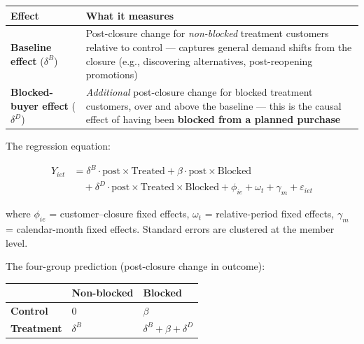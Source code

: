 \documentclass[
  letterpaper,
  DIV=11,
  numbers=noendperiod]{scrartcl}
\newcounter{none} %
\begin{document}
{\def\LTcaptype{none} %
\begin{longtable}[]{@{}
  >{\raggedright\arraybackslash}p{}
  >{\raggedright\arraybackslash}p{}@{}}
\toprule\noalign{}
\begin{minipage}[b]{\linewidth}\raggedright
Effect
\end{minipage} & \begin{minipage}[b]{\linewidth}\raggedright
What it measures
\end{minipage} \\
\midrule\noalign{}
\endhead
\bottomrule\noalign{}
\endlastfoot
\textbf{Baseline effect} (\(\delta^B\)) & Post-closure change for
\emph{non-blocked} treatment customers relative to control --- captures
general demand shifts from the closure (e.g., discovering alternatives,
post-reopening promotions) \\
\textbf{Blocked-buyer effect} (\(\delta^D\)) & \emph{Additional}
post-closure change for blocked treatment customers, over and above the
baseline --- this is the causal effect of having been \textbf{blocked
from a planned purchase} \\
\end{longtable}
}

The regression equation:

\begin{align}
Y_{iet} &= \delta^B \cdot \text{post} \times \text{Treated}
         + \beta \cdot \text{post} \times \text{Blocked} \\
        &\quad + \delta^D \cdot \text{post} \times \text{Treated} \times \text{Blocked}
         + \phi_{ie} + \omega_t + \gamma_m + \varepsilon_{iet}
\end{align}

where \(\phi_{ie}\) = customer--closure fixed effects, \(\omega_t\) =
relative-period fixed effects, \(\gamma_m\) = calendar-month fixed
effects. Standard errors are clustered at the member level.

The four-group prediction (post-closure change in outcome):

{\def\LTcaptype{none} %
\begin{longtable}[]{@{}lll@{}}
\toprule\noalign{}
& Non-blocked & Blocked \\
\midrule\noalign{}
\endhead
\bottomrule\noalign{}
\endlastfoot
\textbf{Control} & 0 & \(\beta\) \\
\textbf{Treatment} & \(\delta^B\) & \(\delta^B + \beta + \delta^D\) \\
\end{longtable}
}
\end{document}
